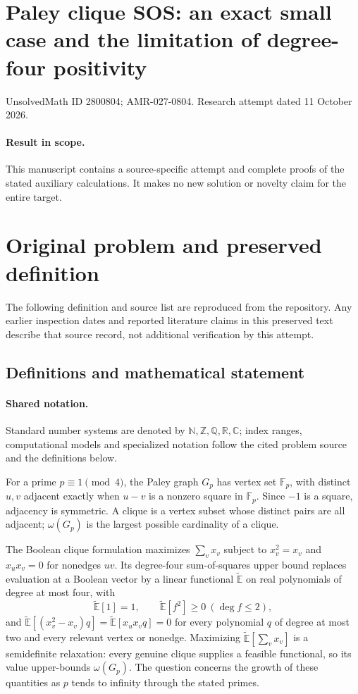 \documentclass[11pt]{article}
\begin{document}
\section*{Paley clique SOS: an exact small case and the limitation of degree-four positivity}
\noindent UnsolvedMath ID 2800804; AMR-027-0804. Research attempt dated 11 October 2026.
\paragraph{Result in scope.}This manuscript contains a source-specific attempt and complete proofs of the stated auxiliary calculations. It makes no new solution or novelty claim for the entire target.
\section{Original problem and preserved definition}
The following definition and source list are reproduced from the repository. Any earlier inspection dates and reported literature claims in this preserved text describe that source record, not additional verification by this attempt.
\subsection{Definitions and mathematical statement}

\paragraph{Shared notation.}Standard number systems are denoted by $\mathbb N,\mathbb Z,\mathbb Q,\mathbb R,\mathbb C$; index ranges, computational models and specialized notation follow the cited problem source and the definitions below.


For a prime $p\equiv1\pmod4$, the Paley graph $G_p$ has vertex set $\mathbb{F}_p$, with distinct $u,v$ adjacent exactly when $u-v$ is a nonzero square in $\mathbb{F}_p$. Since $-1$ is a square, adjacency is symmetric. A clique is a vertex subset whose distinct pairs are all adjacent; $\omega(G_p)$ is the largest possible cardinality of a clique.

The Boolean clique formulation maximizes $\sum_v x_v$ subject to $x_v^2=x_v$ and $x_ux_v=0$ for nonedges $uv$. Its degree-four sum-of-squares upper bound replaces evaluation at a Boolean vector by a linear functional $\widetilde{\mathbb{E}}$ on real polynomials of degree at most four, with
\[
 \widetilde{\mathbb{E}}[1]=1,\qquad
 \widetilde{\mathbb{E}}[f^2]\ge0\ (\deg f\le2),
\]
and $\widetilde{\mathbb{E}}[(x_v^2-x_v)q]=\widetilde{\mathbb{E}}[x_ux_vq]=0$ for every polynomial $q$ of degree at most two and every relevant vertex or nonedge. Maximizing $\widetilde{\mathbb{E}}[\sum_vx_v]$ is a semidefinite relaxation: every genuine clique supplies a feasible functional, so its value upper-bounds $\omega(G_p)$. The question concerns the growth of these quantities as $p$ tends to infinity through the stated primes.
\end{document}
